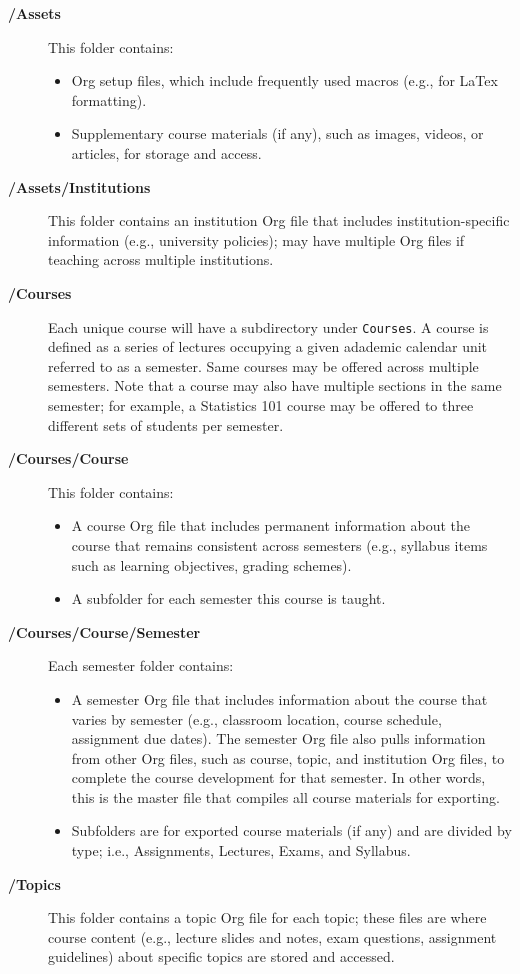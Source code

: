 \documentclass[10pt,article]{article}
\begin{document}
\begin{description}
\item[{\textbf{/Assets}}] This folder contains:
\begin{itemize}
\item Org setup files, which include frequently used macros (e.g., for LaTex
formatting).
\item Supplementary course materials (if any), such as images, videos, or
articles, for storage and access.
\end{itemize}
\item[{\textbf{/Assets/Institutions}}] This folder contains an institution Org file that
includes institution-specific information (e.g., university policies);
may have multiple Org files if teaching across multiple institutions.

\item[{\textbf{/Courses}}] Each unique course will have a subdirectory under \texttt{Courses}. A
course is defined as a series of lectures occupying a given
adademic calendar unit referred to as a semester. Same courses
may be offered across multiple semesters. Note that a course
may also have multiple sections in the same semester; for
example, a Statistics 101 course may be offered to three
different sets of students per semester.
\item[{\textbf{/Courses/Course}}] This folder contains:

\begin{itemize}
\item A course Org file that includes permanent information about the course
that remains consistent across semesters (e.g., syllabus items such as
learning objectives, grading schemes).
\item A subfolder for each semester this course is taught.
\end{itemize}

\item[{\textbf{/Courses/Course/Semester}}] Each semester folder contains:
\begin{itemize}
\item A semester Org file that includes information about the course that varies
by semester (e.g., classroom location, course schedule, assignment due
dates). The semester Org file also pulls information from other Org files,
such as course, topic, and institution Org files, to complete the course
development for that semester. In other words, this is the master file
that compiles all course materials for exporting.
\item Subfolders are for exported course materials (if any) and are
divided by type; i.e., Assignments, Lectures, Exams, and Syllabus.
\end{itemize}
\item[{\textbf{/Topics}}] This folder contains a topic Org file for each topic; these
files are where course content (e.g., lecture slides and notes,
exam questions, assignment guidelines) about specific topics
are stored and accessed.
\end{description}
\end{document}
